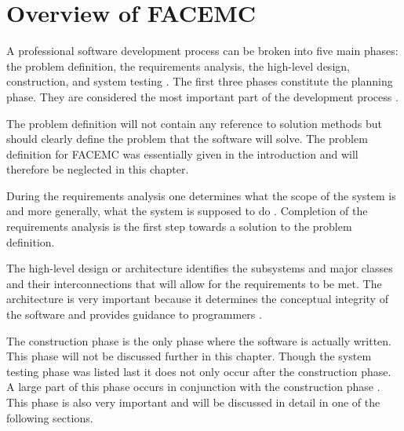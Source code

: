 \chapter{Overview of FACEMC}
\label{ch:code_overview}
A professional software development process can be broken into five main phases:
the problem definition, the requirements analysis, the high-level design, 
construction, and system testing \citep{mcconnell_code_2004}. The first
three phases constitute the planning phase. They are considered the most 
important part of the development process \citep{mcconnell_code_2004}. 

The problem definition will not contain any reference to solution methods
but should clearly define the problem that the software will solve. The
problem definition for FACEMC was essentially given in the introduction and 
will therefore be neglected in this chapter. 

During the requirements analysis one determines what the scope of the system is 
and more generally, what the system is supposed to do 
\citep{mcconnell_code_2004}. Completion of the requirements analysis is the 
first step towards a solution to the problem definition. 

The high-level design or architecture identifies the subsystems and major 
classes and their interconnections that will allow for the requirements 
to be met. The architecture is very important because it determines the 
conceptual integrity of the software and provides guidance to programmers
\citep{mcconnell_code_2004}. 

The construction phase is the only phase where the software is actually written.
This phase will not be discussed further in this chapter. Though the system 
testing phase was listed last it does not only occur after the construction 
phase. A large part of this phase occurs in conjunction with the construction 
phase \citep{mcconnell_code_2004}. This phase is also very important and will 
be discussed in detail in one of the following sections. 

